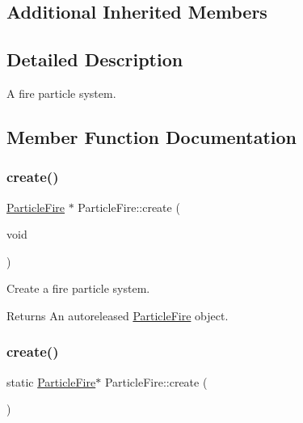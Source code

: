 \subsection*{Additional Inherited Members}


\subsection{Detailed Description}
A fire particle system. 

\subsection{Member Function Documentation}
\mbox{\label{classParticleFire_a9c9efebab1315ae6f5e4fbc32f3dd470}} 
\subsubsection{\texorpdfstring{create()}{create()}\hspace{0.1cm}{\footnotesize\ttfamily [1/2]}}
{\footnotesize\ttfamily \hyperlink{classParticleFire}{Particle\+Fire} $\ast$ Particle\+Fire\+::create (\begin{DoxyParamCaption}\item[{void}]{ }\end{DoxyParamCaption})\hspace{0.3cm}{\ttfamily [static]}}

Create a fire particle system.

\begin{DoxyReturn}{Returns}
An autoreleased \hyperlink{classParticleFire}{Particle\+Fire} object. 
\end{DoxyReturn}
\mbox{\label{classParticleFire_a196e853e59b2875439489e3aa0f29f39}} 
\subsubsection{\texorpdfstring{create()}{create()}\hspace{0.1cm}{\footnotesize\ttfamily [2/2]}}
{\footnotesize\ttfamily static \hyperlink{classParticleFire}{Particle\+Fire}$\ast$ Particle\+Fire\+::create (\begin{DoxyParamCaption}{ }\end{DoxyParamCaption})\hspace{0.3cm}{\ttfamily [static]}}

